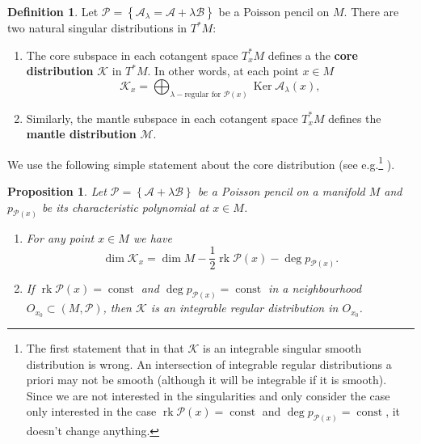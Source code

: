 \documentclass[12pt]{article}
\newtheorem{proposition}[lemma]{Proposition}
\theoremstyle{definition}
\newtheorem{definition}[lemma]{Definition}
\begin{document}
\begin{definition} \label{D:CoreMantleDist} Let $\mathcal{P} = \left\{ \mathcal{A}_{\lambda} = \mathcal{A} + \lambda \mathcal{B}\right\}$ be a Poisson pencil on $M$. There are two natural singular distributions in $T^*M$: 

\begin{enumerate}

\item The core subspace in each cotangent space $T^*_x M$ defines a  the \textbf{core distribution} $\mathcal{K}$ in $T^*M$. In other words, at each point $x \in M$
 \begin{equation} \label{Eq:CoreDist} \mathcal{K}_x =  \bigoplus_{\lambda - \text{regular for $\mathcal{P}(x)$}} \operatorname{Ker}\mathcal{A}_\lambda (x),  \end{equation} 

\item Similarly, the mantle subspace in each cotangent space $T^*_x M$ defines  the \textbf{mantle distribution} $\mathcal{M}$.
 
\end{enumerate}

 \end{definition}

We use the following simple statement about the core distribution (see e.g.\footnote{The first statement that in \cite[Proposition 5.3]{Kozlov23JKRealization} that $\mathcal{K}$ is an integrable singular smooth distribution is wrong. An intersection of integrable regular distributions a priori may not be smooth (although it will be integrable if it is smooth). Since we are not interested in the singularities and only consider the case  only interested in the case $\operatorname{rk} \mathcal{P}(x) = \operatorname{const}$ and $\operatorname{deg} p_{\mathcal{P} (x)} = \operatorname{const}$, it doesn't change anything.} \cite[Proposition 5.3]{Kozlov23JKRealization}).

\begin{proposition} \label{Prop:CoreDistDim}  Let $\mathcal{P} = \left\{\mathcal{A} + \lambda \mathcal{B} \right\}$ be a Poisson pencil on a manifold $M$ and $p_{\mathcal{P}(x)}$ be its characteristic polynomial at $ x\in M$.

\begin{enumerate} 

\item For any point $x \in M$ we have \[\operatorname{dim} \mathcal{K}_x = \operatorname{dim} M - \frac{1}{2} \operatorname{rk} \mathcal{P}(x) - \operatorname{deg} p_{\mathcal{P}(x)}. \]


\item If $\operatorname{rk} \mathcal{P}(x) = \operatorname{const}$ and $\operatorname{deg} p_{\mathcal{P} (x)} = \operatorname{const}$ in a neighbourhood $O_{x_0} \subset (M, \mathcal{P})$, then $\mathcal{K}$ is an integrable regular distribution in $O_{x_0}$.
\end{enumerate}

\end{proposition}
\end{document}
